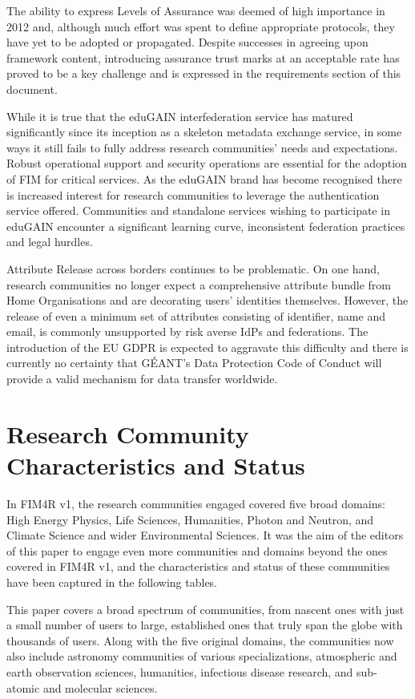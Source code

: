\documentclass[fleqn,11pt]{wlscirep}
\begin{document}
{The ability to express Levels of Assurance was deemed of high importance in 2012 and, although much effort was spent to define appropriate protocols, they have yet to be adopted or propagated. Despite successes in agreeing upon framework content, introducing assurance trust marks at an acceptable rate has proved to be a key challenge and is expressed in the requirements section of this document.

While it is true that the eduGAIN interfederation service has matured significantly since its inception as a skeleton metadata exchange service, in some ways it still fails to fully address research communities’ needs and expectations. Robust operational support and security operations are essential for the adoption of FIM for critical services. As the eduGAIN brand has become recognised there is increased interest for research communities to leverage the authentication service offered. Communities and standalone services wishing to participate in eduGAIN encounter a significant learning curve, inconsistent federation practices and legal hurdles.

Attribute Release across borders continues to be problematic. On one hand, research communities no longer expect a comprehensive attribute bundle from Home Organisations and are decorating users’ identities themselves. However, the release of even a minimum set of attributes consisting of identifier, name and email, is commonly unsupported by risk averse IdPs and federations. The introduction of the EU GDPR is expected to aggravate this difficulty and there is currently no certainty that GÉANT’s Data Protection Code of Conduct\cite{dpcoco} will provide a valid mechanism for data transfer worldwide.

\section{Research Community Characteristics and Status}
In FIM4R v1, the research communities engaged covered five broad domains: High Energy Physics, Life Sciences, Humanities, Photon and Neutron, and Climate Science and wider Environmental Sciences. It was the aim of the editors of this paper to engage even more communities and domains beyond the ones covered in FIM4R v1, and the characteristics and status of these communities have been captured in the following tables. 

This paper covers a broad spectrum of communities, from nascent ones with just a small number of users to large, established ones that truly span the globe with thousands of users. Along with the five original domains, the communities now also include astronomy communities of various specializations, atmospheric and earth observation sciences, humanities, infectious disease research, and sub-atomic and molecular sciences.

}
\end{document}
